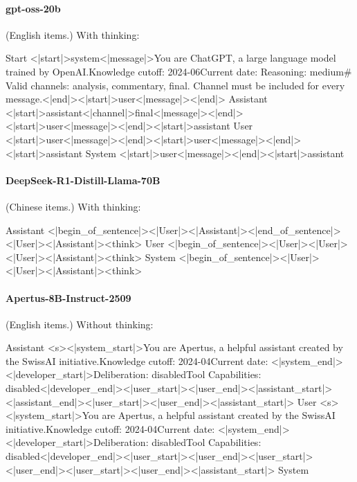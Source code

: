 \paragraph{gpt-oss-20b} (English items.)
\noindent With thinking:
\begin{Rendering}
Start      <|start|>system<|message|>You are ChatGPT, a large language model trained by OpenAI.\NL{}Knowledge cutoff: 2024-06\NL{}Current date: \NL{}\NL{}Reasoning: medium\NL{}\NL{}# Valid channels: analysis, commentary, final. Channel must be included for every message.<|end|><|start|>user<|message|><|end|>
Assistant  <|start|>assistant<|channel|>final<|message|><|end|><|start|>user<|message|><|end|><|start|>assistant
User       <|start|>user<|message|><|end|><|start|>user<|message|><|end|><|start|>assistant
System      <|start|>user<|message|><|end|><|start|>assistant
\end{Rendering}
\paragraph{DeepSeek-R1-Distill-Llama-70B} (Chinese items.)
\noindent With thinking:
\begin{Rendering}
Assistant  <|begin_of_sentence|><|User|><|Assistant|><|end_of_sentence|><|User|><|Assistant|><think>\NL{}
User       <|begin_of_sentence|><|User|><|User|><|User|><|Assistant|><think>\NL{}
System      <|begin_of_sentence|><|User|><|User|><|Assistant|><think>\NL{}
\end{Rendering}
\paragraph{Apertus-8B-Instruct-2509} (English items.)
\noindent Without thinking:
\begin{Rendering}
Assistant  <s><|system_start|>You are Apertus, a helpful assistant created by the SwissAI initiative.\NL{}Knowledge cutoff: 2024-04\NL{}Current date: <|system_end|><|developer_start|>Deliberation: disabled\NL{}Tool Capabilities: disabled<|developer_end|><|user_start|><|user_end|><|assistant_start|><|assistant_end|><|user_start|><|user_end|><|assistant_start|>
User       <s><|system_start|>You are Apertus, a helpful assistant created by the SwissAI initiative.\NL{}Knowledge cutoff: 2024-04\NL{}Current date: <|system_end|><|developer_start|>Deliberation: disabled\NL{}Tool Capabilities: disabled<|developer_end|><|user_start|><|user_end|><|user_start|><|user_end|><|user_start|><|user_end|><|assistant_start|>
System     
\end{Rendering}

